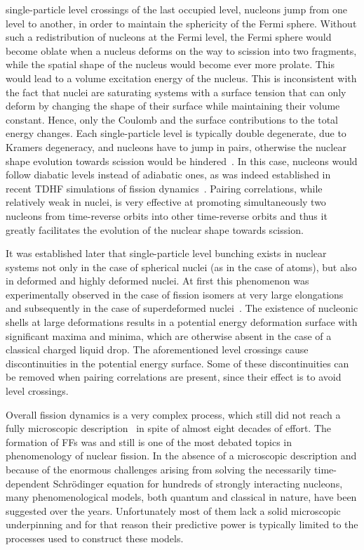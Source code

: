 \documentclass{webofc}
\begin{document}
single-particle level crossings of the last occupied level, nucleons jump from one level to another, in order to maintain the
sphericity of the Fermi sphere. Without such a redistribution of nucleons
at the Fermi level, the Fermi sphere would become oblate when a nucleus deforms on the way to
scission into two fragments, while the
spatial shape of the nucleus would become ever more prolate. This would lead to a
volume excitation energy of the nucleus. This is inconsistent with the fact that nuclei
are saturating systems with a surface tension that can only
deform by changing the shape of their surface while maintaining
their volume constant. Hence, only the Coulomb and the surface
contributions to the total energy changes. Each single-particle level is typically double degenerate, due to
Kramers degeneracy, and nucleons have to jump in pairs,
otherwise the nuclear shape evolution towards scission would be
hindered~\cite{Bertsch:1980,PhysRevLett_1997r}. In this case, nucleons would
follow diabatic levels instead of adiabatic ones, as was indeed established
in recent TDHF simulations of fission dynamics~\cite{arxiv_2015r,arxiv_2015r1}. Pairing correlations,
while relatively weak in nuclei, is very effective
at promoting simultaneously two nucleons from time-reverse orbits into
other time-reverse orbits and thus it greatly facilitates the
evolution of the nuclear shape towards scission.

It was established later that single-particle level bunching exists in
nuclear systems not only in the case of spherical nuclei (as in the
case of atoms), but also in deformed and highly deformed nuclei. At
first this phenomenon was experimentally observed in the case of
fission isomers at very large
elongations~\cite{Polikanov,RMP_1972r,RMP_1980r} and subsequently in
the case of superdeformed nuclei~\cite{Twin}.  The existence of
nucleonic shells at large deformations results in a potential energy
deformation surface with significant maxima and minima, which are
otherwise absent in the case of a classical charged liquid drop. The
aforementioned level crossings cause discontinuities in the potential energy surface.
Some of these discontinuities can be removed when pairing
correlations are present, since their effect is to avoid level crossings.

Overall fission dynamics is a very complex process, which still
did not reach a fully microscopic description~\cite{arxiv_1511r} in
spite of almost eight decades of effort.
The formation of FFs was and still is one of the most debated topics in
phenomenology of nuclear fission. In the absence of a  microscopic description and
because of the enormous challenges arising from solving the necessarily time-dependent
Schr\"{o}dinger equation for hundreds of strongly interacting nucleons, many
phenomenological models, both quantum and classical in nature,
have been suggested over the years. Unfortunately most of them
lack a solid microscopic underpinning and for that reason their predictive power is
typically limited to the processes used to construct these models.
\end{document}
